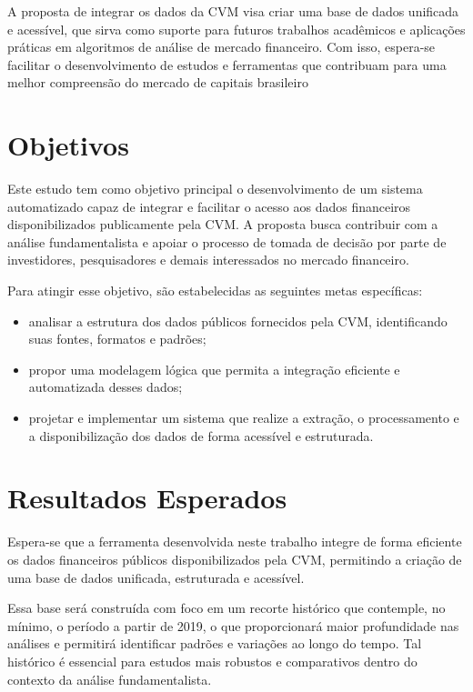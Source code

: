\documentclass[recuosum=1.5cm]{iftex2024}
\begin{document}
A proposta de integrar os dados da CVM visa criar uma base de dados unificada e acessível, que sirva como suporte para futuros trabalhos acadêmicos e aplicações práticas em algoritmos de análise de mercado financeiro. Com isso, espera-se facilitar o desenvolvimento de estudos e ferramentas que contribuam para uma melhor compreensão do mercado de capitais brasileiro \cite{lindman:2020:integration}

\section{Objetivos}

Este estudo tem como objetivo principal o desenvolvimento de um sistema automatizado capaz de integrar e facilitar o acesso aos dados financeiros disponibilizados publicamente pela CVM. A proposta busca contribuir com a análise fundamentalista e apoiar o processo de tomada de decisão por parte de investidores, pesquisadores e demais interessados no mercado financeiro.

Para atingir esse objetivo, são estabelecidas as seguintes metas específicas:

\begin{itemize} 
	\item analisar a estrutura dos dados públicos fornecidos pela CVM, identificando suas fontes, formatos e padrões; 
	\item propor uma modelagem lógica que permita a integração eficiente e automatizada desses dados; 
	\item projetar e implementar um sistema que realize a extração, o processamento e a disponibilização dos dados de forma acessível e estruturada. 
\end{itemize}


\section{Resultados Esperados}

Espera-se que a ferramenta desenvolvida neste trabalho integre de forma eficiente os dados financeiros públicos disponibilizados pela CVM, permitindo a criação de uma base de dados unificada, estruturada e acessível.

Essa base será construída com foco em um recorte histórico que contemple, no mínimo, o período a partir de 2019, o que proporcionará maior profundidade nas análises e permitirá identificar padrões e variações ao longo do tempo. Tal histórico é essencial para estudos mais robustos e comparativos dentro do contexto da análise fundamentalista.
\end{document}
